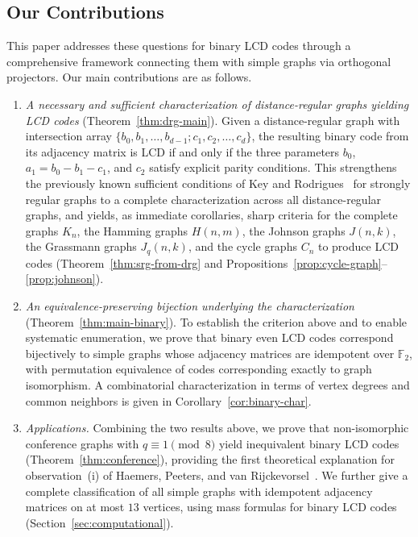 \documentclass[a4paper,11pt]{article}
\theoremstyle{remark}
\newcommand{\FF}{\mathbb{F}}
\begin{document}
\subsection{Our Contributions}

This paper addresses these questions for binary LCD codes through a comprehensive framework connecting them with simple graphs via orthogonal projectors. Our main contributions are as follows.

\begin{enumerate}
\item \emph{A necessary and sufficient characterization of distance-regular graphs yielding LCD codes} (Theorem~\ref{thm:drg-main}). Given a distance-regular graph with intersection array $\{b_0, b_1, \ldots, b_{d-1}; c_1, c_2, \ldots, c_d\}$, the resulting binary code from its adjacency matrix is LCD if and only if the three parameters $b_0$, $a_1 = b_0 - b_1 - c_1$, and $c_2$ satisfy explicit parity conditions. This strengthens the previously known sufficient conditions of Key and Rodrigues~\cite{key2018} for strongly regular graphs to a complete characterization across all distance-regular graphs, and yields, as immediate corollaries, sharp criteria for the complete graphs $K_n$, the Hamming graphs $H(n,m)$, the Johnson graphs $J(n,k)$, the Grassmann graphs $J_q(n,k)$, and the cycle graphs $C_n$ to produce LCD codes (Theorem~\ref{thm:srg-from-drg} and Propositions~\ref{prop:cycle-graph}--\ref{prop:johnson}).

\item \emph{An equivalence-preserving bijection underlying the characterization} (Theorem~\ref{thm:main-binary}). To establish the criterion above and to enable systematic enumeration, we prove that binary even LCD codes correspond bijectively to simple graphs whose adjacency matrices are idempotent over $\FF_2$, with permutation equivalence of codes corresponding exactly to graph isomorphism. A combinatorial characterization in terms of vertex degrees and common neighbors is given in Corollary~\ref{cor:binary-char}.

\item \emph{Applications.} Combining the two results above, we prove that non-isomorphic conference graphs with $q \equiv 1 \pmod 8$ yield inequivalent binary LCD codes (Theorem~\ref{thm:conference}), providing the first theoretical explanation for observation~(i) of Haemers, Peeters, and van Rijckevorsel~\cite{haemers1999}. We further give a complete classification of all simple graphs with idempotent adjacency matrices on at most $13$ vertices, using mass formulas for binary LCD codes (Section~\ref{sec:computational}).
\end{enumerate}
\end{document}
